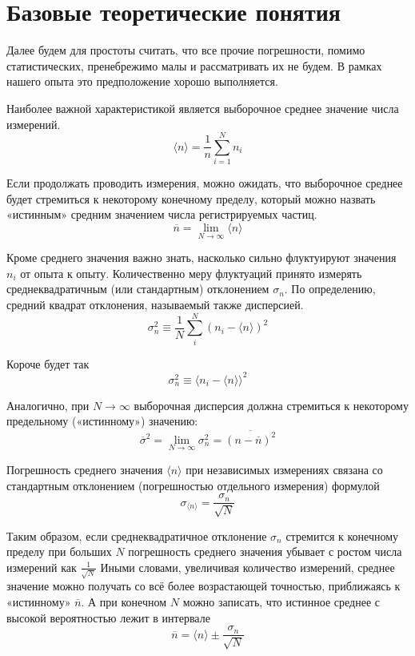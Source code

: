 \documentclass[a4paper, 12pt]{article}
\begin{document}
\section*{Базовые теоретические понятия}

Далее будем для простоты считать, что все прочие погрешности, помимо статистических, пренебрежимо малы и рассматривать их не будем. В рамках нашего опыта это предположение хорошо выполняется.

Наиболее важной характеристикой является выборочное среднее значение числа измерений.
\[\langle n \rangle=\frac{1}{n}\sum^{N}_{i=1}n_{i}\]

Если продолжать проводить измерения, можно ожидать, что выборочное среднее будет стремиться к некоторому конечному пределу, который можно назвать «истинным» средним значением числа регистрируемых частиц.
\[\overline n = \lim_{N \to \infty} \langle n \rangle\]

Кроме среднего значения важно знать, насколько сильно флуктуируют
значения $n_{i}$ от опыта к опыту. Количественно меру флуктуаций принято измерять среднеквадратичным (или стандартным) отклонением $\sigma_{n}$. По определению, средний квадрат отклонения, называемый также дисперсией.
\[\sigma^2_{n}\equiv\frac{1}{N}\sum_{i}^{N}(n_{i}-\langle n\rangle)^2\]

Короче будет так
\[\sigma^2_{n}\equiv\langle n_{i}-\langle n\rangle\rangle^2\]

Аналогично, при $N \to \infty$ выборочная дисперсия должна стремиться к некоторому предельному («истинному») значению:
\[\overline{\sigma}^{2}= \lim_{N \to \infty} {\sigma}^{2}_{n}=\overline{(n-\overline{n})^{2}}\]

Погрешность среднего значения $\langle n \rangle$ при независимых измерениях связана со
стандартным отклонением (погрешностью отдельного измерения) формулой
\begin{equation}\label{average}
    \sigma_{\langle n \rangle}=\frac{\sigma_{n}}{\sqrt{N}}
\end{equation}

\vspace{2cm}

Таким образом, если среднеквадратичное отклонение  $\sigma_{n}$ стремится к конечному пределу при больших $N$ погрешность среднего значения убывает с ростом числа измерений как $\frac{1}{\sqrt{N}}$ Иными словами, увеличивая количество измерений, среднее значение можно получать со всё более возрастающей точностью, приближаясь к «истинному» $\overline{n}$. А при конечном $N$ можно записать,
что истинное среднее с высокой вероятностью лежит в интервале
\[\overline{n}=\langle n\rangle \pm \frac{\sigma_{n}}{\sqrt{N}}\]
\end{document}
